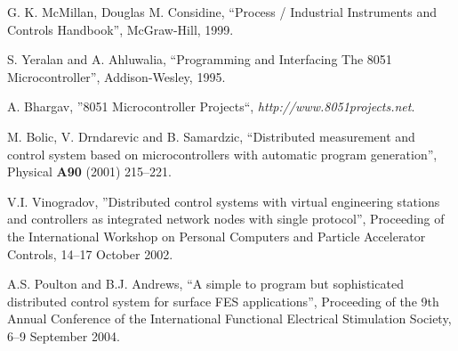 \documentclass[conference,letterpaper]{IEEEtran}
\begin{document}
\begin{thebibliography}{1}
	G. K. McMillan, Douglas M. Considine, “Process / Industrial Instruments and Controls Handbook”, McGraw-Hill, 1999.

	S. Yeralan and A. Ahluwalia, “Programming and Interfacing The 8051 Microcontroller”, Addison-Wesley, 1995.

	A. Bhargav, ''8051 Microcontroller Projects``, \textit{http://www.8051projects.net}.

	M. Bolic, V. Drndarevic and B. Samardzic, “Distributed measurement and control system based on microcontrollers with automatic program generation”, Physical \textbf{A90} (2001) 215--221.

	V.I. Vinogradov, ''Distributed control systems with virtual engineering stations and controllers as integrated network nodes with single protocol'', Proceeding of the International Workshop on Personal Computers and Particle Accelerator Controls, 14--17 October 2002.

	A.S. Poulton and B.J. Andrews, ``A simple to program but sophisticated distributed control system for
surface FES applications'', Proceeding of the 9th Annual Conference of the International Functional Electrical Stimulation Society, 6--9 September 2004.

\end{thebibliography}
\end{document}

